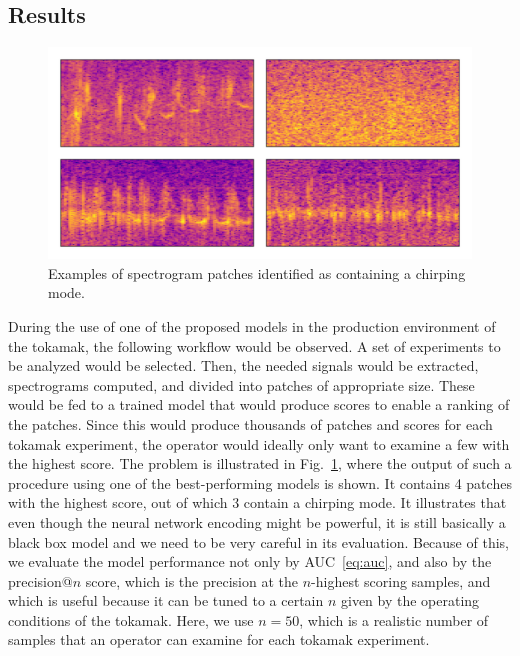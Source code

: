 \subsection{Results}
\begin{figure}
\begin{centering}
\includegraphics[scale=0.5]{data/chapter_alfven/anomalies.png}
\par
\end{centering}
\caption{Examples of spectrogram patches identified as containing a chirping
mode.}
\label{fig:alfven_patches}
\end{figure}

During the use of one of the proposed models in the production environment of the tokamak, the following workflow would be observed. A set of experiments to be analyzed would be selected. Then, the needed signals would be extracted, spectrograms computed, and divided into patches of appropriate size. These would be fed to a trained model that would produce scores to enable a ranking of the patches. Since this would produce thousands of patches and scores for each tokamak experiment, the operator would ideally only want to examine a few with the highest score. The problem is illustrated in Fig.~\ref{fig:alfven_patches}, where the output of such a procedure using one of the best-performing models is shown. It contains 4 patches with the highest score, out of which 3 contain a chirping mode. It illustrates that even though the neural network encoding might be powerful, it is still basically a black box model and we need to be very careful in its evaluation. Because of this, we evaluate the model performance not only by AUC~\eqref{eq:auc}, and also by the precision@$n$ score, which is the precision at the $n$-highest scoring samples, and which is useful because it can be tuned to a certain $n$ given by the operating conditions of the tokamak. Here, we use $n=50$, which is a realistic number of samples that an operator can examine for each tokamak experiment.

